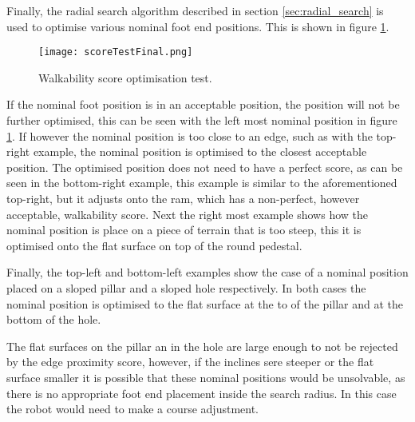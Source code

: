    Finally, the radial search algorithm described in section \ref{sec:radial_search} is used to optimise various nominal foot end positions.
    This is shown in figure \ref{fig:optimisation_test}.
    \begin{figure}[h]
        \centering
        \texttt{[image: scoreTestFinal.png]}
        \caption{Walkability score optimisation test.}
        \label{fig:optimisation_test}
    \end{figure}
    If the nominal foot position is in an acceptable position, the position will not be further optimised, this can be seen with the left most
    nominal position in figure \ref{fig:optimisation_test}. If however the nominal position is too close to an edge, such as with the top-right example, 
    the nominal position is optimised to the closest acceptable position. The optimised position does not need to have a perfect score, as can be seen in the bottom-right example, this example is similar to 
    the aforementioned top-right, but it adjusts onto the ram, which has a non-perfect, however acceptable, walkability score.
    Next the right most example shows how the nominal position is place on a piece of terrain that is too steep, this it is optimised onto the flat surface on top of the round pedestal. 
    
    Finally, the top-left and bottom-left examples show the case of a nominal position placed on a sloped pillar and a sloped hole respectively.
    In both cases the nominal position is optimised to the flat surface at the to of the pillar and at the bottom of the hole.
    
    The flat surfaces on the pillar an in the hole are large enough to not be rejected by the edge proximity score, however, if the inclines sere steeper or the flat surface smaller it is possible that these nominal positions would be
    unsolvable, as there is no appropriate foot end placement inside the search radius. In this case the robot would need to make a course adjustment.


